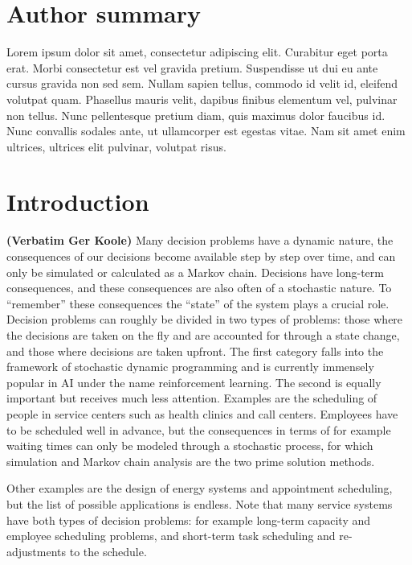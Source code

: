 \documentclass[
  10pt,
  letterpaper,
]{article}
\begin{document}
\section*{Author summary}
Lorem ipsum dolor sit amet, consectetur adipiscing elit. Curabitur eget
porta erat. Morbi consectetur est vel gravida pretium. Suspendisse ut
dui eu ante cursus gravida non sed sem. Nullam sapien tellus, commodo id
velit id, eleifend volutpat quam. Phasellus mauris velit, dapibus
finibus elementum vel, pulvinar non tellus. Nunc pellentesque pretium
diam, quis maximus dolor faucibus id. Nunc convallis sodales ante, ut
ullamcorper est egestas vitae. Nam sit amet enim ultrices, ultrices elit
pulvinar, volutpat risus.

\linenumbers\hypertarget{introduction}{%
\section{Introduction}\label{introduction}}

\textbf{(Verbatim Ger Koole)} Many decision problems have a dynamic
nature, the consequences of our decisions become available step by step
over time, and can only be simulated or calculated as a Markov chain.
Decisions have long-term consequences, and these consequences are also
often of a stochastic nature. To ``remember'' these consequences the
``state'' of the system plays a crucial role. Decision problems can
roughly be divided in two types of problems: those where the decisions
are taken on the fly and are accounted for through a state change, and
those where decisions are taken upfront. The first category falls into
the framework of stochastic dynamic programming and is currently
immensely popular in AI under the name reinforcement learning. The
second is equally important but receives much less attention. Examples
are the scheduling of people in service centers such as health clinics
and call centers. Employees have to be scheduled well in advance, but
the consequences in terms of for example waiting times can only be
modeled through a stochastic process, for which simulation and Markov
chain analysis are the two prime solution methods.

Other examples are the design of energy systems and appointment
scheduling, but the list of possible applications is endless. Note that
many service systems have both types of decision problems: for example
long-term capacity and employee scheduling problems, and short-term task
scheduling and re-adjustments to the schedule.
\end{document}
